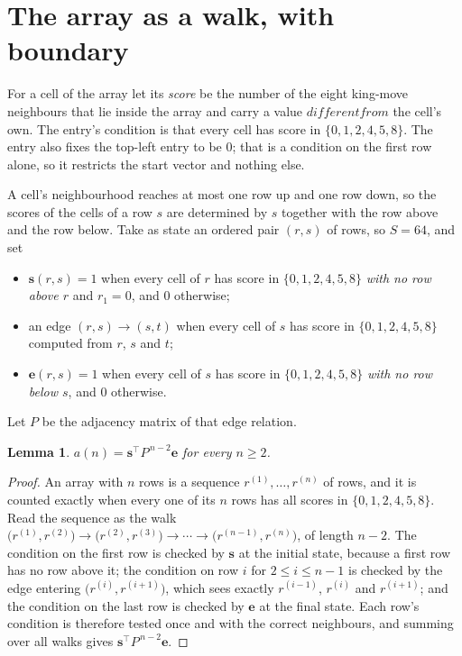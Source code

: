 \documentclass[11pt,a4paper]{article}
\theoremstyle{plain}
\newtheorem{lemma}[theorem]{Lemma}
\theoremstyle{definition}
\begin{document}
\section{The array as a walk, with boundary}

For a cell of the array let its \emph{score} be the number of the eight king-move neighbours that lie inside
the array and carry a value $different from$ the cell's own. The entry's condition is that every cell
has score in $\{0,1,2,4,5,8\}$. The entry also fixes the top-left entry to be $0$; that is a condition on the first row alone, so it restricts the start vector and nothing else.

A cell's neighbourhood reaches at most one row up and one row down, so the scores of the
cells of a row $s$ are determined by $s$ together with the row above and the row below.
Take as state an ordered pair $(r,s)$ of rows, so $S=64$, and set
\begin{itemize}
\item $\mathbf{s}(r,s)=1$ when every cell of $r$ has score in $\{0,1,2,4,5,8\}$ \emph{with no row
above $r$} and $r_1=0$, and $0$ otherwise;
\item an edge $(r,s)\to(s,t)$ when every cell of $s$ has score in $\{0,1,2,4,5,8\}$ computed from
$r$, $s$ and $t$;
\item $\mathbf{e}(r,s)=1$ when every cell of $s$ has score in $\{0,1,2,4,5,8\}$ \emph{with no row
below $s$}, and $0$ otherwise.
\end{itemize}
Let $P$ be the adjacency matrix of that edge relation.

\begin{lemma}\label{lem:walk}
$a(n)=\mathbf{s}^{\!\top}P^{\,n-2}\mathbf{e}$ for every $n\ge2$.
\end{lemma}

\begin{proof}
An array with $n$ rows is a sequence $r^{(1)},\dots,r^{(n)}$ of rows, and it is counted
exactly when every one of its $n$ rows has all scores in $\{0,1,2,4,5,8\}$. Read the sequence as the
walk $\bigl(r^{(1)},r^{(2)}\bigr)\to\bigl(r^{(2)},r^{(3)}\bigr)\to\cdots\to
\bigl(r^{(n-1)},r^{(n)}\bigr)$, of length $n-2$. The condition on the first row is
checked by $\mathbf{s}$ at the initial state, because a first row has no row above it; the
condition on row $i$ for $2\le i\le n-1$ is checked by the edge entering
$\bigl(r^{(i)},r^{(i+1)}\bigr)$, which sees exactly $r^{(i-1)}$, $r^{(i)}$ and
$r^{(i+1)}$; and the condition on the last row is checked by $\mathbf{e}$ at the final
state. Each row's condition is therefore tested once and with the correct neighbours, and
summing over all walks gives $\mathbf{s}^{\!\top}P^{\,n-2}\mathbf{e}$.
\end{proof}
\end{document}
